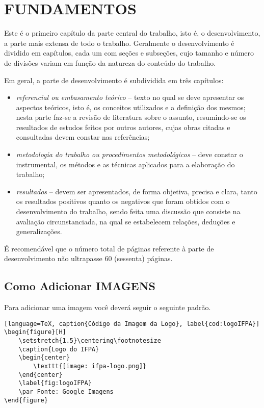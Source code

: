 \chapter{FUNDAMENTOS}
\label{sec:fundamentos}


Este é o primeiro capítulo da parte central do trabalho, isto é, o desenvolvimento, a parte mais extensa de todo o trabalho. Geralmente o desenvolvimento é dividido em capítulos, cada um com seções e subseções, cujo tamanho e número de divisões variam em função da natureza do conteúdo do trabalho.

Em geral, a parte de desenvolvimento é subdividida em três capítulos:

\begin{itemize}
    \item \textit{referencial ou embasamento teórico} – texto no qual se deve apresentar os aspectos teóricos, isto é, os conceitos utilizados e a definição dos mesmos; nesta parte faz-se a revisão de literatura sobre o assunto, resumindo-se os resultados de estudos feitos por outros autores, cujas obras citadas e consultadas devem constar nas referências;

    \item \textit{metodologia do trabalho ou procedimentos metodológicos} – deve constar o instrumental, os métodos e as técnicas aplicados para a elaboração do trabalho;

    \item \textit{resultados} – devem ser apresentados, de forma objetiva, precisa e clara, tanto os resultados positivos quanto os negativos que foram obtidos com o desenvolvimento do trabalho, sendo feita uma discussão que consiste na avaliação circunstanciada, na qual se estabelecem relações, deduções e generalizações.

\end{itemize}

É recomendável que o número total de páginas referente à parte de desenvolvimento não ultrapasse 60 (sessenta) páginas.

\section{Como Adicionar IMAGENS}

    Para adicionar uma imagem você deverá seguir o seguinte padrão.

\begin{lstlisting}[language=TeX, caption{Código da Imagem da Logo}, label{cod:logoIFPA}]
\begin{figure}[H]
    \setstretch{1.5}\centering\footnotesize
    \caption{Logo do IFPA}
    \begin{center}
        \texttt{[image: ifpa-logo.png]}
    \end{center}
    \label{fig:logoIFPA}
    \par Fonte: Google Imagens
\end{figure}
\end{lstlisting}

